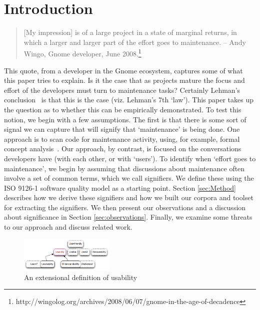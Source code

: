 \documentclass[conference, compsoc]{IEEEtran}
\begin{document}
\section{Introduction}\label{sect:introduction}%
\begin{quote}[My impression] is of a large project in a state of marginal returns, in which a larger and larger part of the effort goes to maintenance. -- Andy Wingo, Gnome developer, June 2008.\footnote{http://wingolog.org/archives/2008/06/07/gnome-in-the-age-of-decadence}\end{quote}
	This quote, from a developer in the Gnome ecosystem, captures some of what this paper tries to explain. Is it the case that as projects mature the focus and effort of the developers must turn to maintenance tasks\cite{Swanson1976}? Certainly Lehman's conclusion~\cite{lehman_software_2006} is that this is the case (viz. Lehman's 7th `law'). This paper takes up the question as to whether this can be empirically demonstrated. To test this notion, we begin with a few assumptions. The first is that there is some sort of signal we can capture that will signify that `maintenance' is being done. One approach is to scan code for maintenance activity, using, for example, formal concept analysis~\cite{breu06msr}. Our approach, by contrast, is focused on the conversations developers have (with each other, or with `users'). To identify when `effort goes to maintenance', we begin by assuming that discussions about maintenance often involve a set of common terms, which we call signifiers. We define these using the ISO 9126-1 software quality model \cite{iso9126} as a starting point. Section \ref{sec:Method} describes how we derive these signifiers and how we built our corpora and toolset for extracting the signifiers. We then present our observations and a discussion about significance in Section \ref{sec:observations}. Finally, we examine some threats to our approach and discuss related work. 

\begin{figure}[b]
\centering
\includegraphics[width=0.4\textwidth]{synonym-graph.png}
\caption{An extensional definition of usability}
\label{fig:syngraph}
\end{figure}
	
\end{document}
